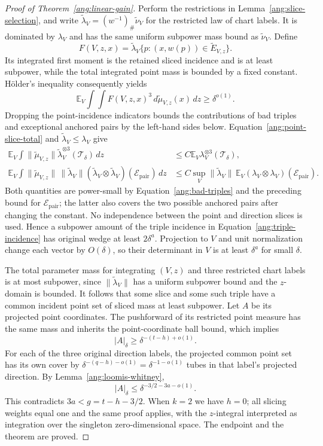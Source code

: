 \begin{proof}[Proof of Theorem~\ref{ang:linear-gain}]
Perform the restrictions in Lemma~\ref{ang:slice-selection}, and
write $\widetilde\lambda_V=(w^{-1})_\#\widetilde\nu_V$ for the restricted
law of chart labels. It is dominated by $\lambda_V$ and has the same
uniform subpower mass bound as $\widetilde\nu_V$. Define
\[
 F(V,z,x)=\widetilde\lambda_V
 \{p:(x,w(p))\in\widetilde E_{V,z}\}.
\]
Its integrated first moment is the retained sliced incidence and is at
least subpower, while the total integrated point mass is bounded by a
fixed constant.
H\"older's inequality consequently yields
\begin{equation}\label{ang:triple-incidence}
 \mathbb E_V\int\int F(V,z,x)^3
                 \,d\widetilde\mu_{V,z}(x)\,dz
       \ge\delta^{o(1)}.
\end{equation}
Dropping the point-incidence indicators bounds the contributions of
bad triples and exceptional anchored pairs by the left-hand sides below.
Equation~\eqref{ang:point-slice-total} and
$\widetilde\lambda_V\le\lambda_V$ give
\begin{align*}
 \mathbb E_V\int \|\widetilde\mu_{V,z}\|
      \widetilde\lambda_V^{\otimes3}(\mathcal T_\delta)\,dz
 &\le C\mathbb E_V\lambda_V^{\otimes3}(\mathcal T_\delta),\\
 \mathbb E_V\int \|\widetilde\mu_{V,z}\|\,\|\widetilde\lambda_V\|
      (\widetilde\lambda_V\otimes\widetilde\lambda_V)
          (\mathcal E_{\mathrm{pair}})\,dz
 &\le C\sup_V\|\widetilde\lambda_V\|\,
      \mathbb E_V(\lambda_V\otimes\lambda_V)
          (\mathcal E_{\mathrm{pair}}).
\end{align*}
Both quantities are power-small by Equation~\eqref{ang:bad-triples}
and the preceding bound for $\mathcal E_{\mathrm{pair}}$; the latter
also covers the two possible anchored pairs after changing the constant. No independence
between the point and direction slices is used. Hence a
subpower amount of the triple incidence in
Equation~\eqref{ang:triple-incidence} has original wedge at least
$2\delta^a$. Projection to $V$ and unit normalization change each
vector by $O(\delta)$, so their determinant in $V$ is at least
$\delta^a$ for small $\delta$.

The total parameter mass for integrating $(V,z)$ and three restricted
chart labels is at most subpower, since $\|\widetilde\lambda_V\|$ has a
uniform subpower bound and the $z$-domain is bounded.
It follows that some slice and some such triple have a common
incident point set of sliced mass at least subpower. Let $A$ be its
projected point coordinates. The pushforward of its restricted point
measure has the same mass and inherits the point-coordinate ball bound,
which implies
\[
 |A|_\delta\ge\delta^{-(t-h)+o(1)}.
\]
For each of the three original direction labels, the projected common
point set has its own cover by
$\delta^{-(q-h)-o(1)}=\delta^{-1-o(1)}$ tubes in that label's projected
direction. By
Lemma~\ref{ang:loomis-whitney},
\[
 |A|_\delta\le\delta^{-3/2-3a-o(1)}.
\]
This contradicts $3a<g=t-h-3/2$. When $k=2$ we have $h=0$;
all slicing weights equal one and the same proof applies, with the
$z$-integral interpreted as integration over the singleton
zero-dimensional space. The endpoint and the theorem are proved.
\end{proof}
